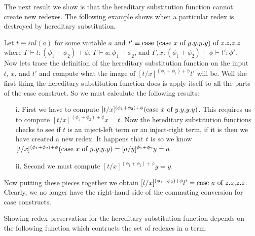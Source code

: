 The next result we show is that the hereditary substitution function cannot 
create new redexes.  The following example shows when a particular redex is destroyed
by hereditary substitution.
\begin{example}
  \label{ex:commuting_conv_example_ssfp}
  Let $t \equiv inl(a)$ for some variable $a$ and $t' \equiv \mbox{case}\ (\mbox{case}\ x\ \text{of}\ y\text{.}y\text{,}y\text{.}y)\ \text{of}\ z\text{.}z\text{,}z\text{.}z$
  where $\Gamma \vdash t : (\phi_1 + \phi_2) + \phi$, $\Gamma \vdash a : \phi_1 + \phi_2$, and 
  $\Gamma, x : (\phi_1 + \phi_2) + \phi \vdash t' : \phi'$.  Now lets trace the definition of 
  the hereditary substitution function on the input $t$, $x$, and $t'$ and compute what the 
  image of $[t/x]^{(\phi_1 + \phi_2) + \phi} t'$ will be.
  Well the first thing the hereditary substitution function does is apply itself to all the 
  parts of the case construct. So we must calculute the following results:
  \begin{itemize}
  \item[i.] First we have to compute $[t/x]^{(\phi_1 + \phi_2) + \phi} (\mbox{case}\ x\ \text{of}\ y\text{.}y\text{,}y\text{.}y)$.  This 
    requires us to compute $[t/x]^{(\phi_1 + \phi_2) + \phi} x = t$.  Now the hereditary 
    substitution functions checks to see if $t$ is an inject-left term
    or an inject-right term, if it is then we have created a new redex.  It happens that 
    $t$ is so we know 
    $[t/x]^{(\phi_1 + \phi_2) + \phi} (\mbox{case}\ x\ \text{of}\ y\text{.}y\text{,}y\text{.}y) = [a/y]^{\phi_1 + \phi_2} y = a$.

  \item[ii.] Second we must compute $[t/x]^{(\phi_1 + \phi_2) + \phi} y = y$.
  \end{itemize}
  Now putting these pieces together we obtain 
  $[t/x]^{(\phi_1 + \phi_2) + \phi} t' = \mbox{case}\ a\ \text{of}\ z\text{.}z\text{,}z\text{.}z$.  Clearly,
  we no longer have the right-hand side of the commuting conversion for case constructs.
\end{example}
Showing redex preservation for the hereditary substitution function
depends on the following function which contructs the set of redexes
in a term.
